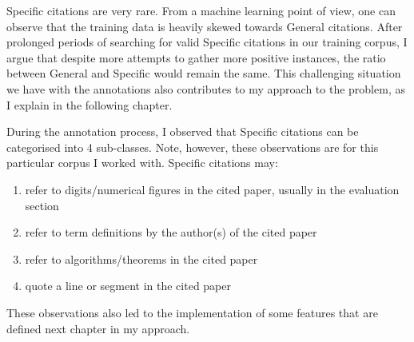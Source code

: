 Specific citations are very rare. From a machine learning point of view, one can observe that the training data is heavily skewed towards General citations. After prolonged periods of searching for valid Specific citations in our training corpus, I argue that despite more attempts to gather more positive instances, the ratio between General and Specific would remain the same. This challenging situation we have with the annotations also contributes to my approach to the problem, as I explain in the following chapter.

During the annotation process, I observed that Specific citations can be categorised into 4 sub-classes. Note, however, these observations are for this particular corpus I worked with. Specific citations may:
\begin{enumerate}
\item refer to digits/numerical figures in the cited paper, usually in the evaluation section
\item refer to term definitions by the author(s) of the cited paper
\item refer to algorithms/theorems in the cited paper
\item quote a line or segment in the cited paper
\end{enumerate}
These observations also led to the implementation of some features that are defined next chapter in my approach.
